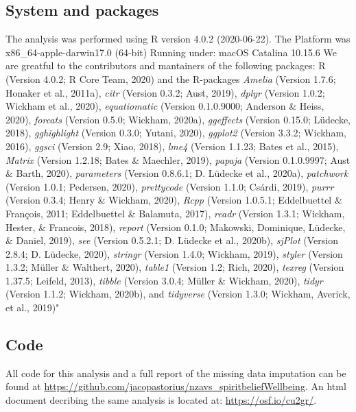 \documentclass[
  english,
  man,floatsintext]{apa6}
\begin{document}
\hypertarget{system-and-packages}{%
\subsection{System and packages}\label{system-and-packages}}

The analysis was performed using R version 4.0.2 (2020-06-22). The Platform was x86\_64-apple-darwin17.0 (64-bit) Running under: macOS Catalina 10.15.6
We are greatful to the contributors and mantainers of the following packages:
R (Version 4.0.2; R Core Team, 2020) and the R-packages \emph{Amelia} (Version 1.7.6; Honaker et al., 2011a), \emph{citr} (Version 0.3.2; Aust, 2019), \emph{dplyr} (Version 1.0.2; Wickham et al., 2020), \emph{equatiomatic} (Version 0.1.0.9000; Anderson \& Heiss, 2020), \emph{forcats} (Version 0.5.0; Wickham, 2020a), \emph{ggeffects} (Version 0.15.0; Lüdecke, 2018), \emph{gghighlight} (Version 0.3.0; Yutani, 2020), \emph{ggplot2} (Version 3.3.2; Wickham, 2016), \emph{ggsci} (Version 2.9; Xiao, 2018), \emph{lme4} (Version 1.1.23; Bates et al., 2015), \emph{Matrix} (Version 1.2.18; Bates \& Maechler, 2019), \emph{papaja} (Version 0.1.0.9997; Aust \& Barth, 2020), \emph{parameters} (Version 0.8.6.1; D. Lüdecke et al., 2020a), \emph{patchwork} (Version 1.0.1; Pedersen, 2020), \emph{prettycode} (Version 1.1.0; Csárdi, 2019), \emph{purrr} (Version 0.3.4; Henry \& Wickham, 2020), \emph{Rcpp} (Version 1.0.5.1; Eddelbuettel \& François, 2011; Eddelbuettel \& Balamuta, 2017), \emph{readr} (Version 1.3.1; Wickham, Hester, \& Francois, 2018), \emph{report} (Version 0.1.0; Makowski, Dominique, Lüdecke, \& Daniel, 2019), \emph{see} (Version 0.5.2.1; D. Lüdecke et al., 2020b), \emph{sjPlot} (Version 2.8.4; D. Lüdecke, 2020), \emph{stringr} (Version 1.4.0; Wickham, 2019), \emph{styler} (Version 1.3.2; Müller \& Walthert, 2020), \emph{table1} (Version 1.2; Rich, 2020), \emph{texreg} (Version 1.37.5; Leifeld, 2013), \emph{tibble} (Version 3.0.4; Müller \& Wickham, 2020), \emph{tidyr} (Version 1.1.2; Wickham, 2020b), and \emph{tidyverse} (Version 1.3.0; Wickham, Averick, et al., 2019)"

\hypertarget{code}{%
\subsection{Code}\label{code}}

All code for this analysis and a full report of the missing data imputation can be found at \url{https://github.com/jacopastorius/nzavs_spiritbeliefWellbeing}. An html document decribing the same analysis is located at: \url{https://osf.io/cu2gr/}.
\end{document}
